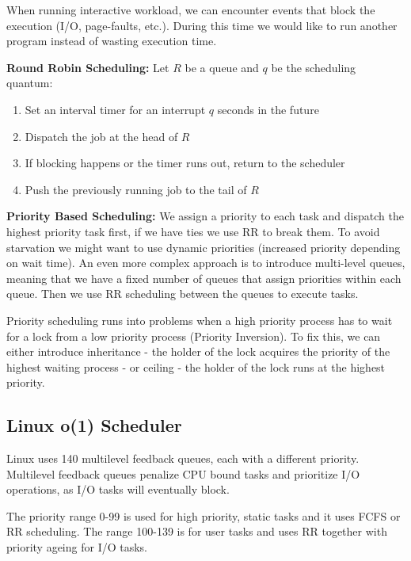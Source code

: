 When running interactive workload, we can encounter events that block the execution (I/O, page-faults, etc.). During this time we would like to run another program instead of wasting execution time. \medskip

\textbf{Round Robin Scheduling:} Let $R$ be a queue and $q$ be the scheduling quantum:
\begin{enumerate}
	\item Set an interval timer for an interrupt $q$ seconds in the future
	\item Dispatch the job at the head of $R$
	\item If blocking happens or the timer runs out, return to the scheduler
	\item Push the previously running job to the tail of $R$
\end{enumerate}

\textbf{Priority Based Scheduling:} We assign a priority to each task and dispatch the highest priority task first, if we have ties we use RR to break them. To avoid starvation we might want to use dynamic priorities (increased priority depending on wait time). An even more complex approach is to introduce multi-level queues, meaning that we have a fixed number of queues that assign priorities within each queue. Then we use RR scheduling between the queues to execute tasks. \medskip

Priority scheduling runs into problems when a high priority process has to wait for a lock from a low priority process (Priority Inversion). To fix this, we can either introduce inheritance - the holder of the lock acquires the priority of the highest waiting process - or ceiling - the holder of the lock runs at the highest priority.


\subsection{Linux o(1) Scheduler}

Linux uses 140 multilevel feedback queues, each with a different priority. Multilevel feedback queues penalize CPU bound tasks and prioritize I/O operations, as I/O tasks will eventually block. \medskip

The priority range 0-99 is used for high priority, static tasks and it uses FCFS or RR scheduling. The range 100-139 is for user tasks and uses RR together with priority ageing for I/O tasks.
